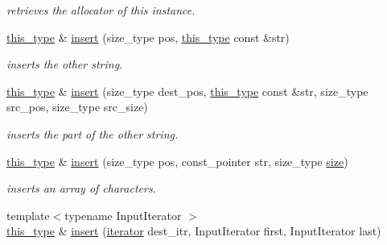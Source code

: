 \begin{DoxyCompactItemize}
\begin{DoxyCompactList}\small\item\em retrieves the allocator of this instance. \end{DoxyCompactList}\item 
\hypertarget{classhryky_1_1_string_a9895ebf2c4792fc2636caf5c6a9b31c3}{\hyperlink{classhryky_1_1_string}{this\-\_\-type} \& \hyperlink{classhryky_1_1_string_a9895ebf2c4792fc2636caf5c6a9b31c3}{insert} (size\-\_\-type pos, \hyperlink{classhryky_1_1_string}{this\-\_\-type} const \&str)}\label{classhryky_1_1_string_a9895ebf2c4792fc2636caf5c6a9b31c3}

\begin{DoxyCompactList}\small\item\em inserts the other string. \end{DoxyCompactList}\item 
\hypertarget{classhryky_1_1_string_af1ae40208e3a4d23ae2e1db91464aa28}{\hyperlink{classhryky_1_1_string}{this\-\_\-type} \& \hyperlink{classhryky_1_1_string_af1ae40208e3a4d23ae2e1db91464aa28}{insert} (size\-\_\-type dest\-\_\-pos, \hyperlink{classhryky_1_1_string}{this\-\_\-type} const \&str, size\-\_\-type src\-\_\-pos, size\-\_\-type src\-\_\-size)}\label{classhryky_1_1_string_af1ae40208e3a4d23ae2e1db91464aa28}

\begin{DoxyCompactList}\small\item\em inserts the part of the other string. \end{DoxyCompactList}\item 
\hypertarget{classhryky_1_1_string_ae46c7efdd4c00f15357feb208072a386}{\hyperlink{classhryky_1_1_string}{this\-\_\-type} \& \hyperlink{classhryky_1_1_string_ae46c7efdd4c00f15357feb208072a386}{insert} (size\-\_\-type pos, const\-\_\-pointer str, size\-\_\-type \hyperlink{classhryky_1_1_string_a9db0f71dce7b2de86a54ab5323759265}{size})}\label{classhryky_1_1_string_ae46c7efdd4c00f15357feb208072a386}

\begin{DoxyCompactList}\small\item\em inserts an array of characters. \end{DoxyCompactList}\item 
\hypertarget{classhryky_1_1_string_a11c90b922251a14dfd64beae2edb0906}{{\footnotesize template$<$typename Input\-Iterator $>$ }\\\hyperlink{classhryky_1_1_string}{this\-\_\-type} \& \hyperlink{classhryky_1_1_string_a11c90b922251a14dfd64beae2edb0906}{insert} (\hyperlink{classhryky_1_1iterator_1_1random_1_1_mutable}{iterator} dest\-\_\-itr, Input\-Iterator first, Input\-Iterator last)}\label{classhryky_1_1_string_a11c90b922251a14dfd64beae2edb0906}


\end{DoxyCompactItemize}
